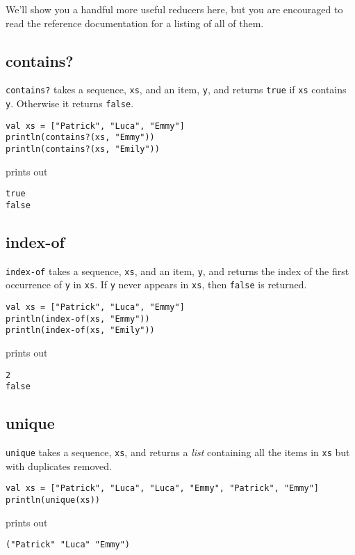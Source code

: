 \documentclass[10pt,oneside]{book}
\begin{document}
We'll show you a handful more useful reducers here, but you are encouraged to read the reference documentation for a listing of all of them. 

\subsection*{contains?}
\texttt{\frenchspacing contains?} takes a sequence, \texttt{\frenchspacing xs}, and an item, \texttt{\frenchspacing y}, and returns \texttt{\frenchspacing true} if \texttt{\frenchspacing xs} contains \texttt{\frenchspacing y}. Otherwise it returns \texttt{\frenchspacing false}.
\begin{lstlisting}
val xs = ["Patrick", "Luca", "Emmy"]
println(contains?(xs, "Emmy"))
println(contains?(xs, "Emily"))
\end{lstlisting}
prints out
\begin{lstlisting}
true
false
\end{lstlisting}

\subsection*{index-of}
\texttt{\frenchspacing index-of} takes a sequence, \texttt{\frenchspacing xs}, and an item, \texttt{\frenchspacing y}, and returns the index of the first occurrence of \texttt{\frenchspacing y} in \texttt{\frenchspacing xs}. If \texttt{\frenchspacing y} never appears in \texttt{\frenchspacing xs}, then \texttt{\frenchspacing false} is returned.
\begin{lstlisting}
val xs = ["Patrick", "Luca", "Emmy"]
println(index-of(xs, "Emmy"))
println(index-of(xs, "Emily"))
\end{lstlisting}
prints out
\begin{lstlisting}
2
false
\end{lstlisting}

\subsection*{unique}
\texttt{\frenchspacing unique} takes a sequence, \texttt{\frenchspacing xs}, and returns a {\em list} containing all the items in \texttt{\frenchspacing xs} but with duplicates removed. 
\begin{lstlisting}
val xs = ["Patrick", "Luca", "Luca", "Emmy", "Patrick", "Emmy"]
println(unique(xs))
\end{lstlisting}
prints out
\begin{lstlisting}
("Patrick" "Luca" "Emmy")
\end{lstlisting}
\end{document}
